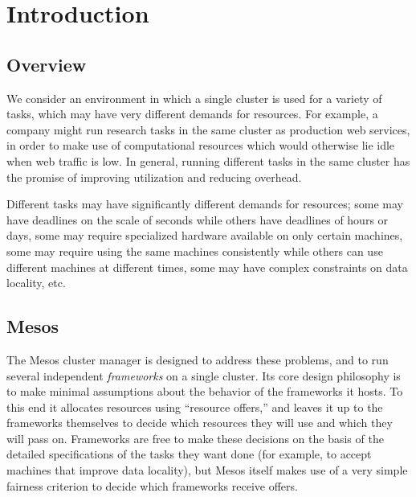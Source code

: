\documentclass{acm_proc_article-sp}
\begin{document}



\section{Introduction}
\subsection{Overview}
We consider an environment in which a single cluster is used for a variety of
tasks, which may have very different demands for resources. For example, a
company might run research tasks in the same cluster as production web services,
in order to make use of computational resources which would otherwise lie idle
when web traffic is low. In general, running different tasks in the same cluster
has the promise of improving utilization and reducing overhead. 

Different tasks may have significantly different demands for resources; some may
have deadlines on the scale of seconds while others have deadlines of hours or
days, some may require specialized hardware available on only certain machines,
some may require using the same machines consistently while others can use
different machines at different times, some may have complex constraints on data
locality, etc. 

\subsection{Mesos}
The Mesos cluster manager is designed to address these problems, and to run
several independent \emph{frameworks} on a single cluster. Its core design philosophy
is to make minimal assumptions about the behavior of the frameworks it hosts. To
this end it allocates resources using ``resource offers,'' and leaves it up to the
frameworks themselves to decide which resources they will use and which they
will pass on. Frameworks are free to make these decisions on the basis of the
detailed specifications of the tasks they want done (for example, to accept
machines that improve data locality), but Mesos itself makes use of a very
simple fairness criterion to decide which frameworks receive offers.
\end{document}
